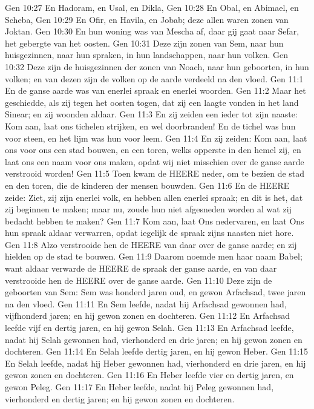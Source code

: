 Gen 10:27  En Hadoram, en Usal, en Dikla,
Gen 10:28  En Obal, en Abimael, en Scheba,
Gen 10:29  En Ofir, en Havila, en Jobab; deze allen waren zonen van Joktan.
Gen 10:30  En hun woning was van Mescha af, daar gij gaat naar Sefar, het gebergte van het oosten.
Gen 10:31  Deze zijn zonen van Sem, naar hun huisgezinnen, naar hun spraken, in hun landschappen, naar hun volken.
Gen 10:32  Deze zijn de huisgezinnen der zonen van Noach, naar hun geboorten, in hun volken; en van dezen zijn de volken op de aarde verdeeld na den vloed.
Gen 11:1  En de ganse aarde was van enerlei spraak en enerlei woorden.
Gen 11:2  Maar het geschiedde, als zij tegen het oosten togen, dat zij een laagte vonden in het land Sinear; en zij woonden aldaar.
Gen 11:3  En zij zeiden een ieder tot zijn naaste: Kom aan, laat ons tichelen strijken, en wel doorbranden! En de tichel was hun voor steen, en het lijm was hun voor leem.
Gen 11:4  En zij zeiden: Kom aan, laat ons voor ons een stad bouwen, en een toren, welks opperste in den hemel zij, en laat ons een naam voor ons maken, opdat wij niet misschien over de ganse aarde verstrooid worden!
Gen 11:5  Toen kwam de HEERE neder, om te bezien de stad en den toren, die de kinderen der mensen bouwden.
Gen 11:6  En de HEERE zeide: Ziet, zij zijn enerlei volk, en hebben allen enerlei spraak; en dit is het, dat zij beginnen te maken; maar nu, zoude hun niet afgesneden worden al wat zij bedacht hebben te maken?
Gen 11:7  Kom aan, laat Ons nedervaren, en laat Ons hun spraak aldaar verwarren, opdat iegelijk de spraak zijns naasten niet hore.
Gen 11:8  Alzo verstrooide hen de HEERE van daar over de ganse aarde; en zij hielden op de stad te bouwen.
Gen 11:9  Daarom noemde men haar naam Babel; want aldaar verwarde de HEERE de spraak der ganse aarde, en van daar verstrooide hen de HEERE over de ganse aarde.
Gen 11:10  Deze zijn de geboorten van Sem: Sem was honderd jaren oud, en gewon Arfachsad, twee jaren na den vloed.
Gen 11:11  En Sem leefde, nadat hij Arfachsad gewonnen had, vijfhonderd jaren; en hij gewon zonen en dochteren.
Gen 11:12  En Arfachsad leefde vijf en dertig jaren, en hij gewon Selah.
Gen 11:13  En Arfachsad leefde, nadat hij Selah gewonnen had, vierhonderd en drie jaren; en hij gewon zonen en dochteren.
Gen 11:14  En Selah leefde dertig jaren, en hij gewon Heber.
Gen 11:15  En Selah leefde, nadat hij Heber gewonnen had, vierhonderd en drie jaren, en hij gewon zonen en dochteren.
Gen 11:16  En Heber leefde vier en dertig jaren, en gewon Peleg.
Gen 11:17  En Heber leefde, nadat hij Peleg gewonnen had, vierhonderd en dertig jaren; en hij gewon zonen en dochteren.
